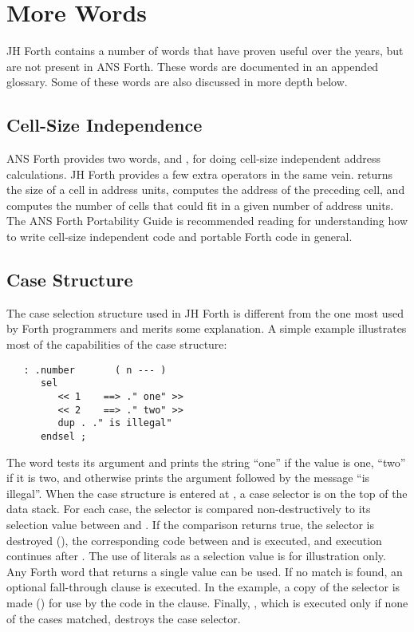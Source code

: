 \section{More Words}
JH Forth contains a number of words that have proven useful over
the years, but are not present in ANS Forth.
These words are documented
in an appended glossary.  Some of these words are also discussed in more
depth below.

\subsection{Cell-Size Independence}
ANS Forth provides two words,  and , for doing
cell-size independent address calculations.  JH Forth provides
a few extra operators in the same vein.   returns the size
of a cell in address units,  computes the address of the
preceding cell, and  computes the number of cells
that could fit in a given number of address units.  The ANS Forth
Portability Guide is recommended reading for understanding how
to write cell-size independent code and portable Forth code in
general.

\subsection{Case Structure}
The case selection structure used in JH Forth is different from
the one most used by Forth programmers and merits some
explanation.  A simple example illustrates most of the capabilities of
the case structure:
\begin{verbatim}
   : .number       ( n --- )
      sel
         << 1    ==> ." one" >>
         << 2    ==> ." two" >>
         dup . ." is illegal"
      endsel ;
\end{verbatim}
The word  tests its argument and prints the string ``one''
if the value is one, ``two'' if it is two, and otherwise prints the
argument followed by the message ``is illegal''.  When the case
structure is entered at , a case selector is on the top of the
data stack.  For each case, the selector is compared
non-destructively to its selection value between \fw{$<<$} and
\fw{==$>$}.  If the comparison returns true, the selector is destroyed
(), the corresponding code between \fw{==$>$} and \fw{$>>$}
is executed, and execution continues after .  The use of
literals as a selection value is for illustration only.  Any Forth word
that returns a single value can be used.  If no match is found, an
optional fall-through clause is executed.  In the example, a
copy of the selector is made () for use by the code
in the clause.
Finally, , which is executed only if none of the cases
matched, destroys the case selector.

